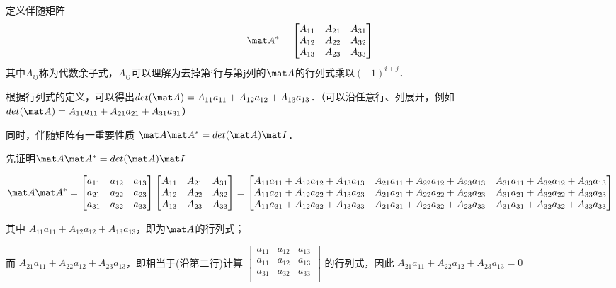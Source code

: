 定义伴随矩阵
\begin{equation}
\mat A^*=
\begin{bmatrix}
A_{11}&A_{21}&A_{31}\\
A_{12}&A_{22}&A_{32}\\
A_{13}&A_{23}&A_{33}\\
\end{bmatrix}
\end{equation}
其中$A_{ij}$称为代数余子式，$A_{ij}$可以理解为去掉第i行与第j列的$\mat A$的行列式乘以$(-1)^{i+j}$．

根据行列式的定义，可以得出$det(\mat A) = A_{11}a_{11}+A_{12}a_{12}+A_{13}a_{13}$．（可以沿任意行、列展开，例如$det(\mat A) = A_{11}a_{11}+A_{21}a_{21}+A_{31}a_{31}$）

同时，伴随矩阵有一重要性质 $\mat A \mat A^* = det(\mat A)\mat I$．

先证明$\mat A \mat A^* = det(\mat A)\mat I$

\begin{equation}
\mat A \mat A^* =
\begin{bmatrix}
a_{11}&a_{12}&a_{13}\\
a_{21}&a_{22}&a_{23}\\
a_{31}&a_{32}&a_{33}\\
\end{bmatrix}
\begin{bmatrix}
A_{11}&A_{21}&A_{31}\\
A_{12}&A_{22}&A_{32}\\
A_{13}&A_{23}&A_{33}\\
\end{bmatrix}
=
\begin{bmatrix}
A_{11}a_{11}+A_{12}a_{12}+A_{13}a_{13}&A_{21}a_{11}+A_{22}a_{12}+A_{23}a_{13}&A_{31}a_{11}+A_{32}a_{12}+A_{33}a_{13}\\
A_{11}a_{21}+A_{12}a_{22}+A_{13}a_{23}&A_{21}a_{21}+A_{22}a_{22}+A_{23}a_{23}&A_{31}a_{21}+A_{32}a_{22}+A_{33}a_{23}\\
A_{11}a_{31}+A_{12}a_{32}+A_{13}a_{33}&A_{21}a_{31}+A_{22}a_{32}+A_{23}a_{33}&A_{31}a_{31}+A_{32}a_{32}+A_{33}a_{33}\\
\end{bmatrix}
\end{equation}

其中
$
A_{11}a_{11}+A_{12}a_{12}+A_{13}a_{13}
$，即为$\mat A$的行列式；

而
$
A_{21}a_{11}+A_{22}a_{12}+A_{23}a_{13}
$，即相当于(沿第二行)计算
$
\begin{bmatrix}
a_{11}&a_{12}&a_{13}\\
a_{11}&a_{12}&a_{13}\\
a_{31}&a_{32}&a_{33}\\
\end{bmatrix}
$
的行列式，因此
$
A_{21}a_{11}+A_{22}a_{12}+A_{23}a_{13}=0
$

